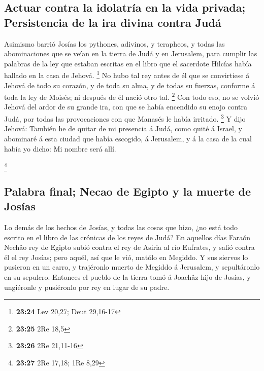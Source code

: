 \hypertarget{actuar-contra-la-idolatruxeda-en-la-vida-privada-persistencia-de-la-ira-divina-contra-juduxe1}{%
\subsection{Actuar contra la idolatría en la vida privada; Persistencia
de la ira divina contra
Judá}\label{actuar-contra-la-idolatruxeda-en-la-vida-privada-persistencia-de-la-ira-divina-contra-juduxe1}}

 Asimismo barrió Josías los pythones, adivinos, y
terapheos, y todas las abominaciones que se veían en la tierra de Judá y
en Jerusalem, para cumplir las palabras de la ley que estaban escritas
en el libro que el sacerdote Hilcías había hallado en la casa de Jehová.
\footnote{\textbf{23:24} Lev 20,27; Deut 29,16-17}  No
hubo tal rey antes de él que se convirtiese á Jehová de todo su corazón,
y de toda su alma, y de todas su fuerzas, conforme á toda la ley de
Moisés; ni después de él nació otro tal. \footnote{\textbf{23:25} 2Re
  18,5}  Con todo eso, no se volvió Jehová del ardor de
su grande ira, con que se había encendido su enojo contra Judá, por
todas las provocaciones con que Manasés le había irritado. \footnote{\textbf{23:26}
  2Re 21,11-16}  Y dijo Jehová: También he de quitar de
mi presencia á Judá, como quité á Israel, y abominaré á esta ciudad que
había escogido, á Jerusalem, y á la casa de la cual había yo dicho: Mi
nombre será allí.

\footnote{\textbf{23:27} 2Re 17,18; 1Re 8,29}

\hypertarget{palabra-final-necao-de-egipto-y-la-muerte-de-josuxedas}{%
\subsection{Palabra final; Necao de Egipto y la muerte de
Josías}\label{palabra-final-necao-de-egipto-y-la-muerte-de-josuxedas}}

 Lo demás de los hechos de Josías, y todas las cosas que
hizo, ¿no está todo escrito en el libro de las crónicas de los reyes de
Judá?  En aquellos días Faraón Nechâo rey de Egipto subió
contra el rey de Asiria al río Eufrates, y salió contra él el rey
Josías; pero aquél, así que le vió, matólo en Megiddo.  Y
sus siervos lo pusieron en un carro, y trajéronlo muerto de Megiddo á
Jerusalem, y sepultáronlo en su sepulcro. Entonces el pueblo de la
tierra tomó á Joachâz hijo de Josías, y ungiéronle y pusiéronlo por rey
en lugar de su padre.

